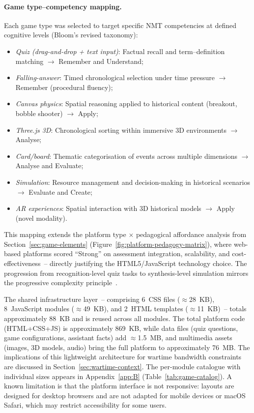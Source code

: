 \paragraph{Game type--competency mapping.}
Each game type was selected to target specific NMT competencies at defined cognitive levels (Bloom's revised taxonomy):
\begin{itemize}
\item \emph{Quiz (drag-and-drop + text input)}: Factual recall and term--definition matching $\rightarrow$ Remember and Understand;
\item \emph{Falling-answer}: Timed chronological selection under time pressure $\rightarrow$ Remember (procedural fluency);
\item \emph{Canvas physics}: Spatial reasoning applied to historical content (breakout, bobble shooter) $\rightarrow$ Apply;
\item \emph{Three.js 3D}: Chronological sorting within immersive 3D environments $\rightarrow$ Analyse;
\item \emph{Card/board}: Thematic categorisation of events across multiple dimensions $\rightarrow$ Analyse and Evaluate;
\item \emph{Simulation}: Resource management and decision-making in historical scenarios $\rightarrow$ Evaluate and Create;
\item \emph{AR experiences}: Spatial interaction with 3D historical models $\rightarrow$ Apply (novel modality).
\end{itemize}
This mapping extends the platform type $\times$ pedagogical affordance analysis from Section~\ref{sec:game-elements} (Figure~\ref{fig:platform-pedagogy-matrix}), where web-based platforms scored ``Strong'' on assessment integration, scalability, and cost-effectiveness~-- directly justifying the HTML5/JavaScript technology choice. The progression from recognition-level quiz tasks to synthesis-level simulation mirrors the progressive complexity principle~\cite{Clark2016, Connolly2012}.

The shared infrastructure layer~-- comprising 6~CSS files ($\approx$28~KB), 8~JavaScript modules ($\approx$49~KB), and 2~HTML templates ($\approx$11~KB)~-- totals approximately 88~KB and is reused across all modules. The total platform code (HTML+CSS+JS) is approximately 869~KB, while data files (quiz questions, game configurations, assistant facts) add $\approx$1.5~MB, and multimedia assets (images, 3D models, audio) bring the full platform to approximately 76~MB. The implications of this lightweight architecture for wartime bandwidth constraints are discussed in Section~\ref{sec:wartime-context}. The per-module catalogue with individual sizes appears in Appendix~\ref{app:B} (Table~\ref{tab:game-catalog}). A known limitation is that the platform interface is not responsive: layouts are designed for desktop browsers and are not adapted for mobile devices or macOS Safari, which may restrict accessibility for some users.

